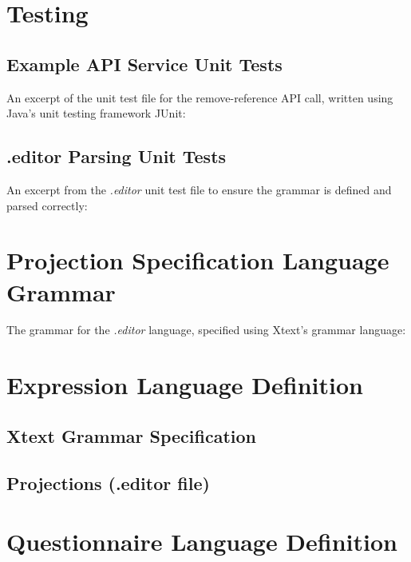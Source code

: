 \section{Testing}
\subsection{Example API Service Unit Tests}\label{apiUnitTest}
An excerpt of the unit test file for the remove-reference API call, written using Java's unit testing framework JUnit:

\subsection{.editor Parsing Unit Tests}\label{editorLanguageTests}
An excerpt from the \emph{.editor} unit test file to ensure the grammar is defined and parsed correctly:


\section{Projection Specification Language Grammar}\label{editorLanguageGrammar}
The grammar for the \emph{.editor} language, specified using Xtext's grammar language:


\section{Expression Language Definition}\label{expressionLanguageDef}
\subsection{Xtext Grammar Specification}


\subsection{Projections (.editor file)}\label{expressionLanguageDefEditor}


\section{Questionnaire Language Definition}\label{questionnaireLanguageDef}


